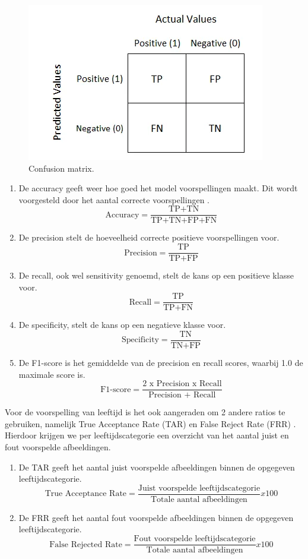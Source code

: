 \begin{figure}
    \centering
    \includegraphics{graphics/confusionmatrix.PNG}
    \caption[Confusion matrix]{Confusion matrix\autocite{Narkhede2018}.
        \label{fig:confusionmatrix}}
\end{figure}
\begin{enumerate}
    \item De accuracy geeft weer hoe goed het model voorspellingen maakt. Dit wordt voorgesteld door het aantal correcte voorspellingen  \autocite{Narkhede2018}.
    \[ \text{Accuracy} = \frac{\text{TP+TN}}{\text{TP+TN+FP+FN}} \]
    
    \item De precision stelt de hoeveelheid correcte positieve voorspellingen voor.
    \[ \text{Precision} = \frac{\text{TP}}{\text{TP+FP}} \]
    
    \item De recall, ook wel sensitivity genoemd, stelt de kans op een positieve klasse voor.  
    \[ \text{Recall} = \frac{\text{TP}}{\text{TP+FN}} \]
    
    \item De specificity, stelt de kans op een negatieve klasse voor.
    \[ \text{Specificity} = \frac{\text{TN}}{\text{TN+FP}} \]
    
    \item De F1-score is het gemiddelde van de precision en recall scores, waarbij 1.0 de maximale score is.
    \[ \text{F1-score} = \frac{\text{2 x Precision x Recall}}{\text{Precision + Recall}} \]
\end{enumerate}

Voor de voorspelling van leeftijd is het ook aangeraden om 2 andere ratios te gebruiken, namelijk True Acceptance Rate (TAR) en False Reject Rate (FRR) \autocite{Othman2014}. Hierdoor krijgen we per leeftijdscategorie een overzicht van het aantal juist en fout voorspelde afbeeldingen. 
\begin{enumerate}
    \item De TAR geeft het aantal juist voorspelde afbeeldingen binnen de opgegeven leeftijdscategorie.
    \[ \text{True Acceptance Rate} = \frac{\text{Juist voorspelde leeftijdscategorie}}{\text{Totale aantal afbeeldingen}} x 100 \]
    \item De FRR geeft het aantal fout voorspelde afbeeldingen binnen de opgegeven leeftijdscategorie.
    \[ \text{False Rejected Rate} = \frac{\text{Fout voorspelde leeftijdscategorie}}{\text{Totale aantal afbeeldingen}}  x 100 \]
\end{enumerate}


